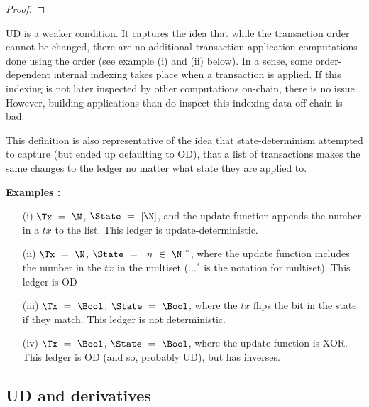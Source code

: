 \begin{proof}
\end{proof}

UD is a weaker condition. It captures the idea that while the transaction order
cannot be changed, there are no additional transaction application computations done
using the order (see example (i) and (ii) below). In a sense, some order-dependent
internal indexing takes place when a transaction is applied. If this indexing is not
later inspected by other computations on-chain, there is no issue. However, building
applications than do inspect this indexing data off-chain is bad.

This definition is also representative of the idea that state-determinism attempted to
capture (but ended up defaulting to OD), that a list of transactions makes the same changes to the ledger no matter
what state they are applied to.


\textbf{Examples : } \\

\begin{itemize}
  \item[(i)] $\Tx~ = ~\N$, $\State~ = ~[\N]$, and the update function appends the number in a $tx$ to the list. This ledger
  is update-deterministic.

  \item[(ii)] $\Tx~ = ~\N$, $\State~ = ~{~ n~\in~\N~}^*$, where the update function includes the number in the $tx$ in the multiset
  (${...}^*$ is the notation for multiset). This ledger is OD

  \item[(iii)] $\Tx~ = ~\Bool$, $\State~ = ~\Bool$, where the $tx$ flips the bit in the state if they match. This ledger is not
  deterministic.

  \item[(iv)] $\Tx~ = ~\Bool$, $\State~ = ~\Bool$, where the update function is XOR. This ledger is OD (and so, probably UD),
  but has inverses.
\end{itemize}

\subsection{UD and derivatives}

